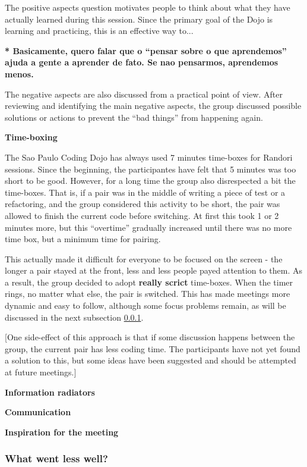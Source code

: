The positive aspects question motivates people to think about what
they have actually learned during this session. Since the primary goal
of the Dojo is learning and practicing, this is an effective way to...

{\bf** Basicamente, quero falar que o ``pensar sobre o que aprendemos''
ajuda a gente a aprender de fato. Se nao pensarmos, aprendemos menos.}

The negative aspects are also discussed from a practical point of
view. After reviewing and identifying the main negative aspects, the
group discussed possible solutions or actions to prevent the ``bad
things'' from happening again.

\noindent
\textbf{Time-boxing}

The Sao Paulo Coding Dojo has always used 7 minutes time-boxes for
Randori sessions. Since the beginning, the participantes have felt
that 5 minutes was too short to be good. However, for a long time the
group also disrespected a bit the time-boxes. That is, if a pair was
in the middle of writing a piece of test or a refactoring, and the
group considered this activity to be short, the pair was allowed to
finish the current code before switching. At first this took 1 or 2
minutes more, but this ``overtime'' gradually increased until there
was no more time box, but a minimum time for pairing.

This actually made it difficult for everyone to be focused on the
screen - the longer a pair stayed at the front, less and less people
payed attention to them. As a result, the group decided to adopt
\textbf{really scrict} time-boxes. When the timer rings, no matter
what else, the pair is switched. This has made meetings more dynamic
and easy to follow, although some focus problems remain, as will be
discussed in the next subsection \ref{ssub:less_well}.

[One side-effect of this approach is that if some discussion happens
between the group, the current pair has less coding time. The
participants have not yet found a solution to this, but some ideas
have been suggested and should be attempted at future meetings.]

\noindent
\textbf{Information radiators}

\noindent
\textbf{Communication}

\noindent
\textbf{Inspiration for the meeting}

\subsubsection{What went less well?}\label{ssub:less_well}

